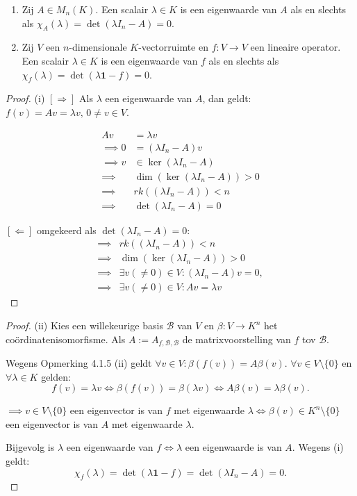 \begin{stelling}[6.2.5]
    \begin{enumerate}
        \item[(i)] Zij $A \in M_n(K)$. Een scalair $\lambda \in K$ is een eigenwaarde van $A$ als en slechts als $\chi_A(\lambda) = \det(\lambda I_n - A) = 0$.
        \item[(ii)] Zij $V$ een $n$-dimensionale $K$-vectorruimte en $f \colon V \to V$ een lineaire operator. Een scalair $\lambda \in K$ is een eigenwaarde van $f$ als en slechts als $\chi_f(\lambda) = \det(\lambda \mathbf{1} - f) = 0$.
    \end{enumerate}
\end{stelling}
\begin{proof}(i)
    \([\Rightarrow]\) Als \(\lambda\) een eigenwaarde van \(A\), dan geldt:
    \(f(v) = Av =\lambda v, \, 0 \neq v \in V\).

    \begin{align*}
        Av &= \lambda v\\
        \implies 0 &= (\lambda I_n - A)v\\
        \implies v &\in \ker(\lambda I_n - A)\\
        \implies &\dim(\ker(\lambda I_n - A)) > 0\\
        \implies &rk((\lambda I_n - A)) < n \\
        \implies &\det(\lambda I_n - A) = 0
    \end{align*}

    \([\Leftarrow]\) omgekeerd als \(\det(\lambda I_n - A) = 0\):
    \begin{align*}
        \implies &rk((\lambda I_n - A)) < n \\
        \implies &\dim(\ker(\lambda I_n - A)) > 0\\
        \implies & \exists v (\neq 0) \in V: (\lambda I_n - A)v = 0 ,\\
        \implies & \exists v (\neq 0) \in V:  Av = \lambda v
    \end{align*}
\end{proof}
\begin{proof}(ii)
    Kies een willekeurige basis \(\mathcal{B}\) van \(V\) en \(\beta \colon V \to K^n\) het  coördinatenisomorfisme. 
    Als \(A := A_{f,\mathcal{B},\mathcal{B}}\) de matrixvoorstelling van \(f\) tov \(\mathcal{B}\).

    Wegens Opmerking 4.1.5 (ii) geldt \( \forall v \in V: \beta(f(v)) = A\beta(v)\).
    \( \forall v \in V \setminus \{0\}\) en \(\forall \lambda \in K\) gelden:
    \[ f(v) = \lambda v \iff \beta(f(v)) = \beta(\lambda v) \iff A\beta(v) = \lambda \beta(v). \]

    \(\implies v \in V \setminus \{0\}\) een eigenvector is van \(f\) met eigenwaarde \(\lambda \iff \beta(v) \in K^n \setminus \{0\}\) een eigenvector is van \(A\) met eigenwaarde \(\lambda\).

    Bijgevolg is \(\lambda\) een eigenwaarde van \(f \iff \lambda\) een eigenwaarde is van \(A\).
    Wegens (i) geldt:
    \[ \chi_f(\lambda) = \det(\lambda \mathbf{1} - f) = \det(\lambda I_n - A) = 0. \]
\end{proof}

